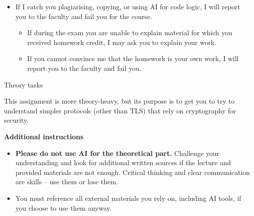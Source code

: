 \documentclass{homework}
\begin{document}
\begin{itemize}
\begin{itemize}
    \item Not acceptable: e.g. generating code logic, library use, or crypto operations.
    \item If you use AI in any form, including for rewording, state in your report where and what you used it for.
    \item I recommend asking in the server or contacting me instead of using AI.
  \end{itemize}
  \item If I catch you plagiarising, copying, or using AI for code logic, I will report you to the faculty and fail you for the course.
  \begin{itemize}
    \item If during the exam you are unable to explain material for which you received homework credit, I may ask you to explain your work.
    \item If you cannot convince me that the homework is your own work, I will report you to the faculty and fail you.
  \end{itemize}
\end{itemize}

\newpage

\begin{center}
  Theory tasks
\end{center}

This assignment is more theory-heavy, but its purpose is to get you to try to understand simpler protocols (other than TLS) that rely on cryptography for security.

\textbf{Additional instructions}

\begin{itemize}
  \item \textbf{Please do not use AI for the theoretical part.}
  Challenge your understanding and look for additional written sources if the lecture and provided materials are not enough.
  Critical thinking and clear communication are skills -- use them or lose them.
  \item You must reference all external materials you rely on, including AI tools, if you choose to use them anyway.
\end{itemize}
\end{document}
